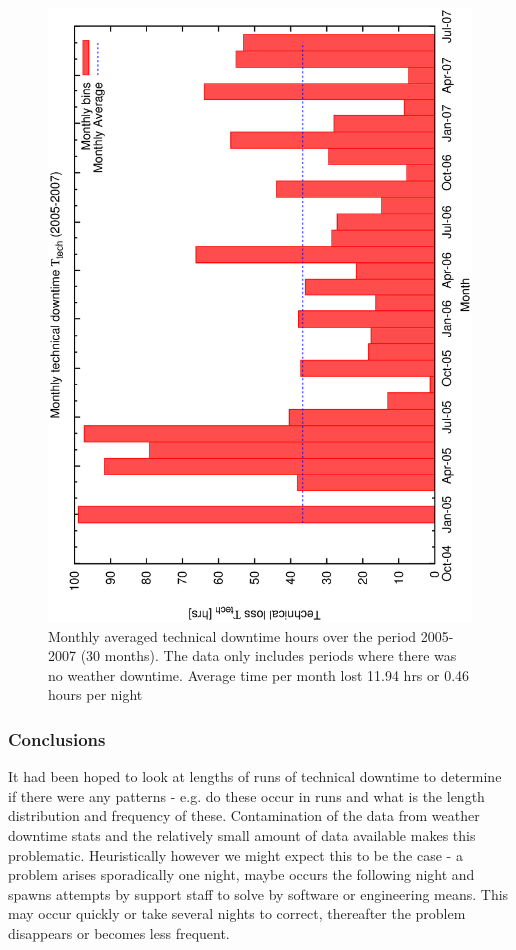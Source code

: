 \begin{figure}[htbp]
  \begin{center}
    \includegraphics[scale=0.4, angle=-90]{figures/ecs/monthly_tech_stats.eps}
  \end{center}   
  \caption[Monthly averaged technical downtime hours.]
{Monthly averaged technical downtime hours over the period 2005-2007 (30 months). The data only includes periods where there was no weather downtime. Average time per month lost 11.94 hrs or 0.46 hours per night}
  \label{fig:monthly_tech_stats}
\end{figure}


\subsubsection{Conclusions}
It had been hoped to look at lengths of runs of technical downtime to determine if there were any patterns - e.g. do these occur in runs and what is the length distribution and frequency of these. Contamination of the data from weather downtime stats and the relatively small amount of data available makes this problematic. Heuristically however we might expect this to be the case - a problem arises sporadically one night, maybe occurs the following night and spawns attempts by support staff to solve by software or engineering means. This may occur quickly or take several nights to correct, thereafter the problem disappears or becomes less frequent.

